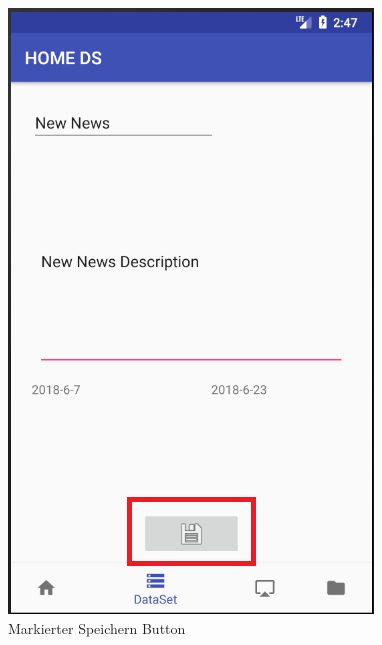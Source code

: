 \begin{figure}[H]
\centering
\includegraphics[scale=0.35]{images/06_AndroidApp/06_EditNewsSaveButton}
\caption{Markierter Speichern Button}
\label{fig:06_EditNewsSaveButton}
\end{figure}

